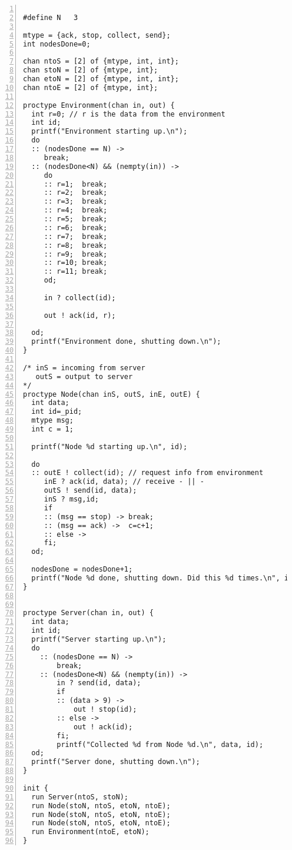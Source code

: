 \begin{lstlisting}[caption=centralized\_decision\_multiple\_nodes\_8jul,language=Promela, numbers=left, basicstyle=\footnotesize, tabsize=2]

#define N   3

mtype = {ack, stop, collect, send};
int nodesDone=0;

chan ntoS = [2] of {mtype, int, int}; 
chan stoN = [2] of {mtype, int}; 
chan etoN = [2] of {mtype, int, int};
chan ntoE = [2] of {mtype, int};

proctype Environment(chan in, out) {
  int r=0; // r is the data from the environment
  int id;  
  printf("Environment starting up.\n");
  do 
  :: (nodesDone == N) -> 
     break;
  :: (nodesDone<N) && (nempty(in)) -> 
     do 
     :: r=1;  break;
     :: r=2;  break;
     :: r=3;  break;
     :: r=4;  break;
     :: r=5;  break;
     :: r=6;  break;
     :: r=7;  break;
     :: r=8;  break;
     :: r=9;  break;
     :: r=10; break;
     :: r=11; break;
     od;

     in ? collect(id);

     out ! ack(id, r);

  od;
  printf("Environment done, shutting down.\n");
}

/* inS = incoming from server
   outS = output to server
*/
proctype Node(chan inS, outS, inE, outE) {
  int data;
  int id=_pid;
  mtype msg;
  int c = 1;

  printf("Node %d starting up.\n", id);

  do 
  :: outE ! collect(id); // request info from environment
     inE ? ack(id, data); // receive - || - 
     outS ! send(id, data);
     inS ? msg,id;
     if 
     :: (msg == stop) -> break;
     :: (msg == ack) ->  c=c+1;
     :: else -> 
     fi;
  od;

  nodesDone = nodesDone+1; 
  printf("Node %d done, shutting down. Did this %d times.\n", id, c);
}


proctype Server(chan in, out) {
  int data;
  int id;
  printf("Server starting up.\n");
  do 
    :: (nodesDone == N) -> 
        break;
    :: (nodesDone<N) && (nempty(in)) -> 
        in ? send(id, data); 
        if 
        :: (data > 9) -> 
            out ! stop(id);
        :: else ->
            out ! ack(id);
        fi;
        printf("Collected %d from Node %d.\n", data, id);
  od;
  printf("Server done, shutting down.\n");
} 

init {
  run Server(ntoS, stoN);
  run Node(stoN, ntoS, etoN, ntoE);
  run Node(stoN, ntoS, etoN, ntoE);
  run Node(stoN, ntoS, etoN, ntoE);
  run Environment(ntoE, etoN);
}

\end{lstlisting}